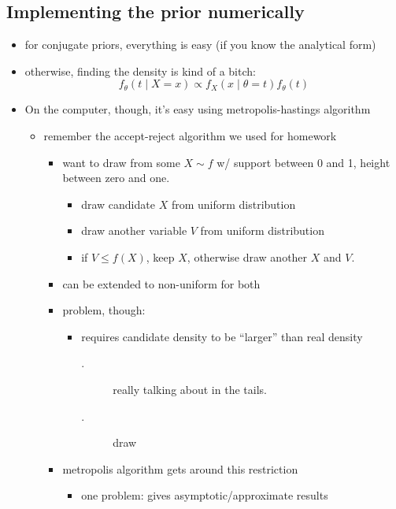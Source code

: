 \subsection{Implementing the prior numerically}

\begin{itemize}
\item for conjugate priors, everything is easy (if you know the analytical form)
\item otherwise, finding the density is kind of a bitch:
  \[f_\theta(t \mid X = x) \propto f_X(x \mid \theta = t) f_\theta(t)\]
\item On the computer, though, it's easy using metropolis-hastings algorithm
\begin{itemize}
\item remember the accept-reject algorithm we used for homework
\begin{itemize}
\item want to draw from some $X \sim f$ w/ support between 0 and 1,
         height between zero and one.
\begin{itemize}
\item draw candidate $X$ from uniform distribution
\item draw another variable $V$ from uniform distribution
\item if $V \leq f(X)$, keep $X$, otherwise draw another $X$ and $V$.
\end{itemize}
\item can be extended to non-uniform for both
\item problem, though:
\begin{itemize}
\item requires candidate density to be ``larger'' than real density
\begin{description}
\item[.] really talking about in the tails.
\item[.] draw
\end{description}
\end{itemize}
\item metropolis algorithm gets around this restriction
\begin{itemize}
\item one problem: gives asymptotic/approximate results
\end{itemize}
\end{itemize}
\end{itemize}
\end{itemize}

